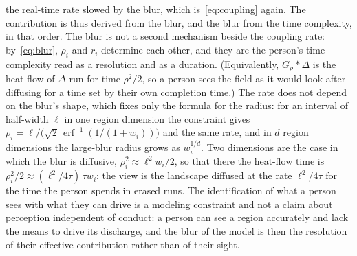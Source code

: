 \documentclass{article}
\begin{document}
the real-time rate slowed by the blur, which is~\eqref{eq:coupling} again. The contribution is thus derived from the blur, and the blur from the time complexity, in that order. The blur is not a second mechanism beside the coupling rate: by~\eqref{eq:blur}, $\rho_i$ and $r_i$ determine each other, and they are the person's time complexity read as a resolution and as a duration. (Equivalently, $G_\rho \ast \Delta$ is the heat flow of $\Delta$ run for time $\rho^2/2$, so a person sees the field as it would look after diffusing for a time set by their own completion time.) The rate does not depend on the blur's shape, which fixes only the formula for the radius: for an interval of half-width $\ell$ in one region dimension the constraint gives $\rho_i = \ell\big/\bigl(\sqrt{2}\,\operatorname{erf}^{-1}(1/(1+w_i))\bigr)$ and the same rate, and in $d$ region dimensions the large-blur radius grows as $w_i^{1/d}$. Two dimensions are the case in which the blur is diffusive, $\rho_i^2 \approx \ell^2 w_i/2$, so that there the heat-flow time is $\rho_i^2/2 \approx (\ell^2/4\tau)\,\tau w_i$: the view is the landscape diffused at the rate $\ell^2/4\tau$ for the time the person spends in erased runs. The identification of what a person sees with what they can drive is a modeling constraint and not a claim about perception independent of conduct: a person can see a region accurately and lack the means to drive its discharge, and the blur of the model is then the resolution of their effective contribution rather than of their sight.
\end{document}
